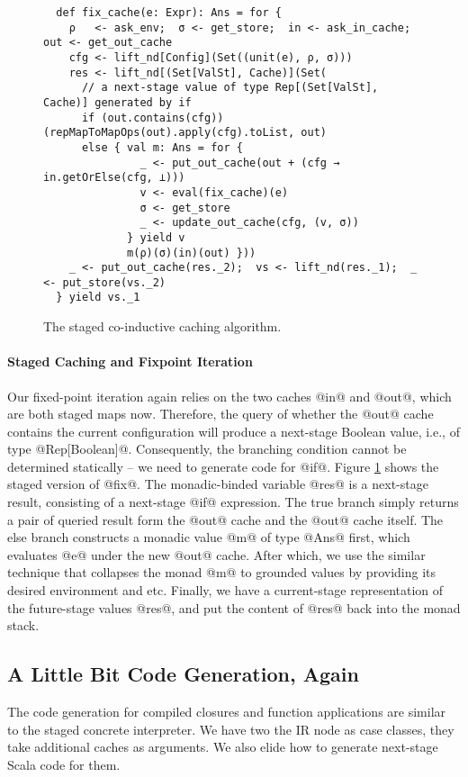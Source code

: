 \begin{figure}[h!]
  \centering
\begin{lstlisting}
  def fix_cache(e: Expr): Ans = for {
    ρ   <- ask_env;  σ <- get_store;  in <- ask_in_cache;  out <- get_out_cache
    cfg <- lift_nd[Config](Set((unit(e), ρ, σ)))
    res <- lift_nd[(Set[ValSt], Cache)](Set(
      // a next-stage value of type Rep[(Set[ValSt], Cache)] generated by if
      if (out.contains(cfg)) (repMapToMapOps(out).apply(cfg).toList, out)
      else { val m: Ans = for {
               _ <- put_out_cache(out + (cfg → in.getOrElse(cfg, ⊥)))
               v <- eval(fix_cache)(e)
               σ <- get_store
               _ <- update_out_cache(cfg, (v, σ)) 
             } yield v
             m(ρ)(σ)(in)(out) }))
    _ <- put_out_cache(res._2);  vs <- lift_nd(res._1);  _ <- put_store(vs._2)
  } yield vs._1 
\end{lstlisting}
\caption{The staged co-inductive caching algorithm.}
\label{fig:staged_coind_cache}
\end{figure}

\paragraph{Staged Caching and Fixpoint Iteration} Our fixed-point iteration
again relies on the two caches @in@ and @out@, which are both staged maps now.
Therefore, the query of whether the @out@ cache contains the current
configuration will produce a next-stage Boolean value, i.e., of type
@Rep[Boolean]@. Consequently, the branching condition cannot be determined
statically -- we need to generate code for @if@. Figure
\ref{fig:staged_coind_cache} shows the staged version of @fix@. The
monadic-binded variable @res@ is a next-stage result, consisting of a next-stage
@if@ expression. The true branch simply returns a pair of queried result form
the @out@ cache and the @out@ cache itself. The else branch constructs a monadic
value @m@ of type @Ans@ first, which evaluates @e@ under the new @out@ cache.
After which, we use the similar technique that collapses the monad @m@ to
grounded values by providing its desired environment and etc. Finally, we have a
current-stage representation of the future-stage values @res@, and put the
content of @res@ back into the monad stack.

\subsection{A Little Bit Code Generation, Again}
The code generation for compiled closures and function applications are similar
to the staged concrete interpreter. We have two the IR node as case classes, they
take additional caches as arguments. We also elide how to generate next-stage Scala
code for them.

